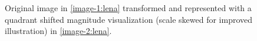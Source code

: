 \begin{figure}
	\centering
    \hfill
	\caption{Original image in \ref{image-1:lena} transformed and represented with a quadrant shifted magnitude visualization (scale skewed for improved illustration) in \ref{image-2:lena}. }
    \label{fig:twodimentransform}
\end{figure}

